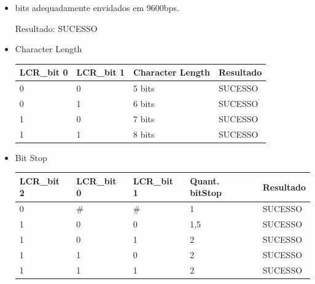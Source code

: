 \documentclass[12pt, a4paper]{article}
\begin{document}
	\begin{itemize}
		\item bits adequadamente envidados em 9600bps.
		\par Resultado: SUCESSO
		
		\item Character Length
		\begin{table}[H]
			\begin{center}
				\begin{tabular}{|l|l|l|l|}
					\hline
					LCR\_bit 0 & LCR\_bit 1 & Character Length & Resultado \\ \hline
					0     & 0     & 5 bits           &SUCESSO           \\ \hline
					0     & 1     & 6 bits           &SUCESSO           \\ \hline
					1     & 0     & 7 bits           &SUCESSO           \\ \hline
					1     & 1     & 8 bits           &SUCESSO           \\ \hline
				\end{tabular}
			\end{center}
		\end{table}
		
		\item Bit Stop
		\begin{table}[H]
			\begin{center}
				\begin{tabular}{|l|l|l|l|l|}
					\hline
					LCR\_bit 2 & LCR\_bit 0 & LCR\_bit 1 & Quant. bitStop & Resultado\\ \hline
					0          & \#         & \#         & 1              & SUCESSO  \\ \hline
					1          & 0          & 0          & 1,5            & SUCESSO  \\ \hline
					1          & 0          & 1          & 2              & SUCESSO  \\ \hline
					1          & 1          & 0          & 2              & SUCESSO  \\ \hline
					1          & 1          & 1          & 2              &  SUCESSO \\ \hline
				\end{tabular}
			\end{center}
		\end{table}
		

\end{itemize}
\end{document}
